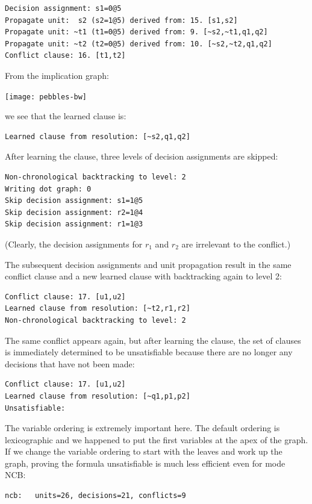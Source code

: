 \documentclass[11pt]{report}
\begin{document}
\begin{verbatim}
Decision assignment: s1=0@5
Propagate unit:  s2 (s2=1@5) derived from: 15. [s1,s2]
Propagate unit: ~t1 (t1=0@5) derived from: 9. [~s2,~t1,q1,q2]
Propagate unit: ~t2 (t2=0@5) derived from: 10. [~s2,~t2,q1,q2]
Conflict clause: 16. [t1,t2]
\end{verbatim}

From the implication graph:
\begin{center}
\texttt{[image: pebbles-bw]}
\end{center}
we see that the learned clause is:
\begin{verbatim}
Learned clause from resolution: [~s2,q1,q2]
\end{verbatim}

After learning the clause, three levels of decision assignments are
skipped:
\begin{verbatim}
Non-chronological backtracking to level: 2
Writing dot graph: 0
Skip decision assignment: s1=1@5
Skip decision assignment: r2=1@4
Skip decision assignment: r1=1@3
\end{verbatim}
(Clearly, the decision assignments for $r_1$ and $r_2$ are irrelevant to
the conflict.)

The subsequent decision assignments and unit propagation result in the
same conflict clause and a new learned clause with backtracking again to
level 2:

\begin{verbatim}
Conflict clause: 17. [u1,u2]
Learned clause from resolution: [~t2,r1,r2]
Non-chronological backtracking to level: 2
\end{verbatim}

The same conflict appears again, but after learning the clause, the set
of clauses is immediately determined to be unsatisfiable because there
are no longer any decisions that have not been made:

\begin{verbatim}
Conflict clause: 17. [u1,u2]
Learned clause from resolution: [~q1,p1,p2]
Unsatisfiable:
\end{verbatim}

The variable ordering is extremely important here. The default ordering
is lexicographic and we happened to put the first variables at the apex
of the graph. If we change the variable ordering to start with the
leaves and work up the graph, proving the formula unsatisfiable is much
less efficient even for mode NCB:

\begin{verbatim}
ncb:   units=26, decisions=21, conflicts=9
\end{verbatim}
\end{document}
